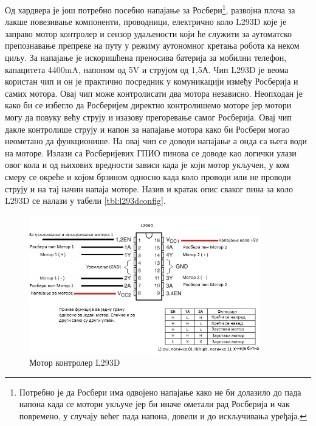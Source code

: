 \documentclass[12pt,oneside]{memoir}
\theoremstyle{remark}
\begin{document}
Од хардвера је још потребно посебно напајање за Росбери\footnote{Потребно је да Росбери има одвојено напајање како не би долазило до пада напона када се мотори укључе јер би иначе ометали рад Росберија и чак повремено, у случају већег пада напона, довели и до искључивања уређаја.}, развојна плоча за лакше повезивање компоненти, проводници, електрично коло L293D које је заправо мотор контролер и сензор удаљености који ће служити за аутоматско препознавање препреке на путу у режиму аутономног кретања робота ка неком циљу. За напајање је искоришћена преносива батерија за мобилни телефон, капацитета 4400mA, напоном од 5V и струјом од 1,5А. Чип L293D је веома користан чип и он је практично посредник у комуникацији између Росберија и самих мотора. Овај чип може контролисати два мотора независно. Неопходан је како би се избегло да Росберијем директно контролишемо моторе јер мотори могу да повуку већу струју и изазову прегоревање самог Росберија. Овај чип дакле контролише струју и напон за напајање мотора како би Росбери могао неометано да функционише. На овај чип се доводи напајање а онда са њега води на моторе. Излази са Росберијевих ГПИО пинова се доводе као логички улази овог кола и од њихових вредности зависи када је који мотор укључен, у ком смеру се окреће и којом брзином односно када коло проводи или не проводи струју и на тај начин напаја моторе. Назив и кратак опис сваког пина за коло L293D се налази у табели \ref{tbl:l293dconfig}.


\begin{figure}[!ht]
\centering
\includegraphics[width=0.9\textwidth]{slike/shemal293d.jpg}
\caption{Мотор контролер L293D}
\label{fig:l293d}
\end{figure}
\end{document}
